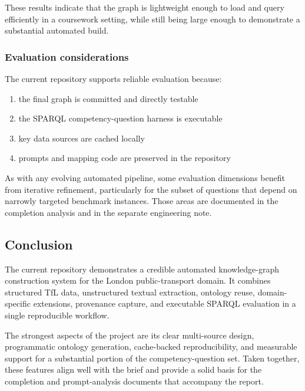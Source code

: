\documentclass[
  11pt,
  a4paper,
]{article}
\providecommand{\tightlist}{%
  \setlength{\itemsep}{0pt}\setlength{\parskip}{0pt}}
\begin{document}
These results indicate that the graph is lightweight enough to load and
query efficiently in a coursework setting, while still being large
enough to demonstrate a substantial automated build.

\subsubsection{Evaluation
considerations}\label{evaluation-considerations}

The current repository supports reliable evaluation because:

\begin{enumerate}
\def\labelenumi{\arabic{enumi}.}
\tightlist
\item
  the final graph is committed and directly testable
\item
  the SPARQL competency-question harness is executable
\item
  key data sources are cached locally
\item
  prompts and mapping code are preserved in the repository
\end{enumerate}

As with any evolving automated pipeline, some evaluation dimensions
benefit from iterative refinement, particularly for the subset of
questions that depend on narrowly targeted benchmark instances. Those
areas are documented in the completion analysis and in the separate
engineering note.

\subsection{Conclusion}\label{conclusion}

The current repository demonstrates a credible automated knowledge-graph
construction system for the London public-transport domain. It combines
structured TfL data, unstructured textual extraction, ontology reuse,
domain-specific extensions, provenance capture, and executable SPARQL
evaluation in a single reproducible workflow.

The strongest aspects of the project are its clear multi-source design,
programmatic ontology generation, cache-backed reproducibility, and
measurable support for a substantial portion of the competency-question
set. Taken together, these features align well with the brief and
provide a solid basis for the completion and prompt-analysis documents
that accompany the report.
\end{document}
